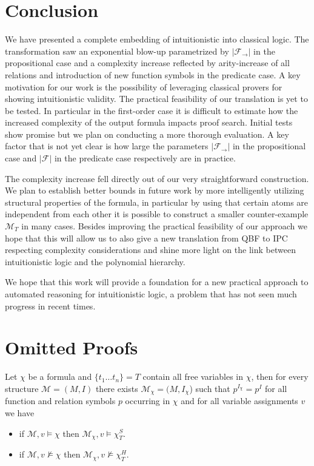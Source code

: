 \documentclass[a4paper,UKenglish,cleveref, autoref, thm-restate]{lipics-v2021}
\begin{document}
\section{Conclusion}

We have presented a complete embedding of intuitionistic into classical logic. The transformation saw an exponential blow-up parametrized by $|\mathcal F_\to|$ in the propositional case and a complexity increase reflected by arity-increase of all relations and introduction of new function symbols in the predicate case. A key motivation for our work is the possibility of leveraging classical provers for showing intuitionistic validity. The practical feasibility of our translation is yet to be tested. In particular in the first-order case it is difficult to estimate how the increased complexity of the output formula impacts proof search. Initial tests show promise but we plan on conducting a more thorough evaluation. A key factor that is not yet clear is how large the parameters $|\mathcal F_\to|$ in the propositional case and $|\mathcal F|$ in the predicate case respectively are in practice.

The complexity increase fell directly out of our very straightforward construction. We plan to establish better bounds in future work by more intelligently utilizing structural properties of the formula, in particular by using that certain atoms are independent from each other it is possible to construct a smaller counter-example $\mathcal M_T$ in many cases. Besides improving the practical feasibility of our approach we hope that this will allow us to also give a new translation from QBF to IPC respecting complexity considerations and shine more light on the link between intuitionistic logic and the polynomial hierarchy.

We hope that this work will provide a foundation for a new practical approach to automated reasoning for intuitionistic logic, a problem that has not seen much progress in recent times.




\appendix

\section{Omitted Proofs}

\begin{lemma}\label{ap1}
	Let $\chi$ be a formula and $\{t_1\dots t_n\} = T$ contain all free variables in $\chi$, then for every structure $\mathcal M = (M, I)$ there exists $\mathcal M_\chi = (M, I_\chi$) such that $p^{I_{\chi}} = p^I$ for all function and relation symbols $p$ occurring in $\chi$ and for all variable assignments $v$ we have
	\begin{itemize}
		\item if $\mathcal M, v\models\chi$ then $\mathcal M_\chi, v\models\chi^S_T$.
		\item if $\mathcal M, v\not\models\chi$ then $\mathcal M_\chi, v\not\models\chi^H_T$.
	\end{itemize}
\end{lemma}
\end{document}
